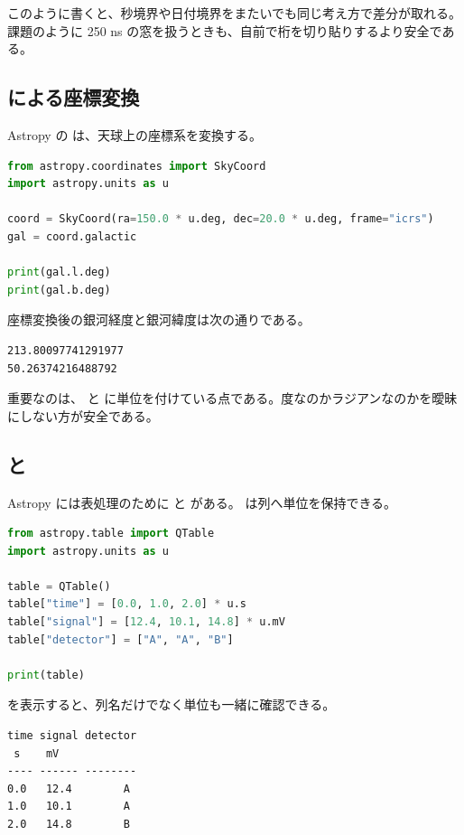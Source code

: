 このように書くと、秒境界や日付境界をまたいでも同じ考え方で差分が取れる。課題のように 250 ns の窓を扱うときも、自前で桁を切り貼りするより安全である。

\subsection{ による座標変換}

Astropy の  は、天球上の座標系を変換する。

\begin{lstlisting}[language=Python]
from astropy.coordinates import SkyCoord
import astropy.units as u

coord = SkyCoord(ra=150.0 * u.deg, dec=20.0 * u.deg, frame="icrs")
gal = coord.galactic

print(gal.l.deg)
print(gal.b.deg)
\end{lstlisting}

座標変換後の銀河経度と銀河緯度は次の通りである。

\begin{lstlisting}[numbers=none, xleftmargin=2\zw]
213.80097741291977
50.26374216488792
\end{lstlisting}

重要なのは、 と  に単位を付けている点である。度なのかラジアンなのかを曖昧にしない方が安全である。

\subsection{ と }

Astropy には表処理のために  と  がある。 は列へ単位を保持できる。

\begin{lstlisting}[language=Python]
from astropy.table import QTable
import astropy.units as u

table = QTable()
table["time"] = [0.0, 1.0, 2.0] * u.s
table["signal"] = [12.4, 10.1, 14.8] * u.mV
table["detector"] = ["A", "A", "B"]

print(table)
\end{lstlisting}

 を表示すると、列名だけでなく単位も一緒に確認できる。

\begin{lstlisting}[numbers=none, xleftmargin=2\zw]
time signal detector
 s    mV
---- ------ --------
0.0   12.4        A
1.0   10.1        A
2.0   14.8        B
\end{lstlisting}

